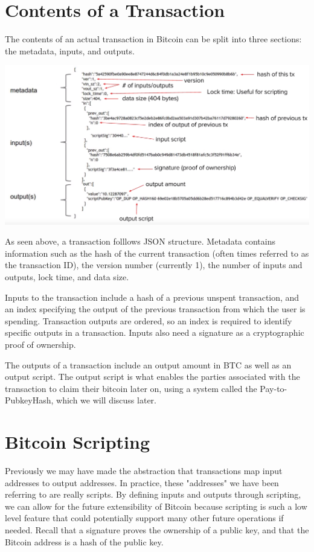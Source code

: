 \documentclass[11pt]{article}
\begin{document}
    \section*{Contents of a Transaction}
    
    The contents of an actual transaction in Bitcoin can be split into three sections: the metadata, inputs, and outputs. 
    
   \includegraphics[scale=0.3]{transaction_contents}
   
   As seen above, a transaction folllows JSON structure. Metadata contains information such as the hash of the current transaction (often times referred to as the transaction ID), the version number (currently 1), the number of inputs and outputs, lock time, and data size.
   
   Inputs to the transaction include a hash of a previous unspent transaction, and an index specifying the output of the previous transaction from which the user is spending. Transaction outputs are ordered, so an index is required to identify specific outputs in a transaction. Inputs also need a signature as a cryptographic proof of ownership. 
   
   The outputs of a transaction include an output amount in BTC as well as an output script. The output script is what enables the parties associated with the transaction to claim their bitcoin later on, using a system called the Pay-to-PubkeyHash, which we will discuss later.
   
   \section*{Bitcoin Scripting}
   
   Previously we may have made the abstraction that transactions map input addresses to output addresses. In practice, these "addresses" we have been referring to are really scripts. By defining inputs and outputs through scripting, we can allow for the future extensibility of Bitcoin because scripting is such a low level feature that could potentially support many other future operations if needed. Recall that a signature proves the ownership of a public key, and that the Bitcoin address is a hash of the public key.
   
\end{document}

